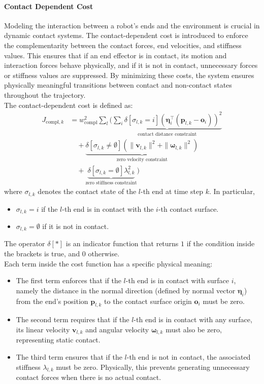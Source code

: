 \documentclass[main.tex]{subfiles}
\begin{document}
\paragraph{Contact Dependent Cost}
Modeling the interaction between a robot's ends and the environment is crucial in dynamic contact systems. The contact-dependent cost is introduced to enforce the complementarity between the contact forces, end velocities, and stiffness values. This ensures that if an end effector is in contact, its motion and interaction forces behave physically, and if it is not in contact, unnecessary forces or stiffness values are suppressed.
By minimizing these costs, the system ensures physically meaningful transitions between contact and non-contact states throughout the trajectory.
\\
The contact-dependent cost is defined as:
\begin{equation}
\begin{aligned}
    J_{\text{compl},k} 
    &= w_{\text{compl}}^2 \sum_l \Bigg(
    \underbrace{ \sum_i \delta\left[\sigma_{l,k} = i\right] \left( \boldsymbol{\eta}_i^\top (\mathbf{p}_{l,k} - \mathbf{o}_i) \right)^2 }_{\text{contact distance constraint}} \\
    &\quad + \underbrace{ \delta\left[\sigma_{l,k} \neq \emptyset\right] \left( \| \mathbf{v}_{l,k} \|^2 + \| \boldsymbol{\omega}_{l,k} \|^2 \right) }_{\text{zero velocity constraint}} \\
    &\quad + \underbrace{ \delta\left[\sigma_{l,k} = \emptyset\right] \lambda_{l,k}^2 }_{\text{zero stiffness constraint}}
    \Bigg)
\end{aligned}
\end{equation}
where $\sigma_{l,k}$ denotes the contact state of the $l$-th end at time step $k$. In particular, 
\begin{itemize}
    \item $\sigma_{l,k} = i$ if the $l$-th end is in contact with the $i$-th contact surface.
    \item $\sigma_{l,k} = \emptyset$ if it is not in contact.
\end{itemize}
The operator $\delta[\ast]$ is an indicator function that returns $1$ if the condition inside the brackets is true, and $0$ otherwise.
\\
Each term inside the cost function has a specific physical meaning:
\begin{itemize}
    \item The first term enforces that if the $l$-th end is in contact with surface $i$, namely the distance in the normal direction (defined by normal vector $\boldsymbol{\eta}_i$) from the end's position $\mathbf{p}_{l,k}$ to the contact surface origin $\mathbf{o}_i$ must be zero.
    \item The second term requires that if the $l$-th end is in contact with any surface, its linear velocity $\mathbf{v}_{l,k}$ and angular velocity $\boldsymbol{\omega}_{l,k}$ must also be zero, representing static contact.
    \item The third term ensures that if the $l$-th end is not in contact, the associated stiffness $\lambda_{l,k}$ must be zero. Physically, this prevents generating unnecessary contact forces when there is no actual contact.
\end{itemize}
\end{document}
